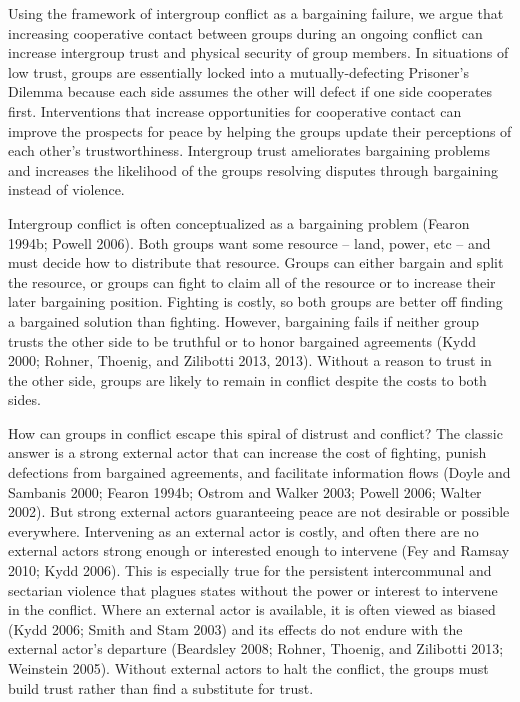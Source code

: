 \documentclass[11pt]{article}
\begin{document}
Using the framework of intergroup conflict as a bargaining failure, we
argue that increasing cooperative contact between groups during an
ongoing conflict can increase intergroup trust and physical security of
group members. In situations of low trust, groups are essentially locked
into a mutually-defecting Prisoner's Dilemma because each side assumes
the other will defect if one side cooperates first. Interventions that
increase opportunities for cooperative contact can improve the prospects
for peace by helping the groups update their perceptions of each other's
trustworthiness. Intergroup trust ameliorates bargaining problems and
increases the likelihood of the groups resolving disputes through
bargaining instead of violence.

Intergroup conflict is often conceptualized as a bargaining problem
(Fearon 1994b; Powell 2006). Both groups want some resource -- land,
power, etc -- and must decide how to distribute that resource. Groups
can either bargain and split the resource, or groups can fight to claim
all of the resource or to increase their later bargaining position.
Fighting is costly, so both groups are better off finding a bargained
solution than fighting. However, bargaining fails if neither group
trusts the other side to be truthful or to honor bargained agreements
(Kydd 2000; Rohner, Thoenig, and Zilibotti 2013, 2013). Without a reason
to trust in the other side, groups are likely to remain in conflict
despite the costs to both sides.

How can groups in conflict escape this spiral of distrust and conflict?
The classic answer is a strong external actor that can increase the cost
of fighting, punish defections from bargained agreements, and facilitate
information flows (Doyle and Sambanis 2000; Fearon 1994b; Ostrom and
Walker 2003; Powell 2006; Walter 2002). But strong external actors
guaranteeing peace are not desirable or possible everywhere. Intervening
as an external actor is costly, and often there are no external actors
strong enough or interested enough to intervene (Fey and Ramsay 2010;
Kydd 2006). This is especially true for the persistent intercommunal and
sectarian violence that plagues states without the power or interest to
intervene in the conflict. Where an external actor is available, it is
often viewed as biased (Kydd 2006; Smith and Stam 2003) and its effects
do not endure with the external actor's departure (Beardsley 2008;
Rohner, Thoenig, and Zilibotti 2013; Weinstein 2005). Without external
actors to halt the conflict, the groups must build trust rather than
find a substitute for trust.
\end{document}
